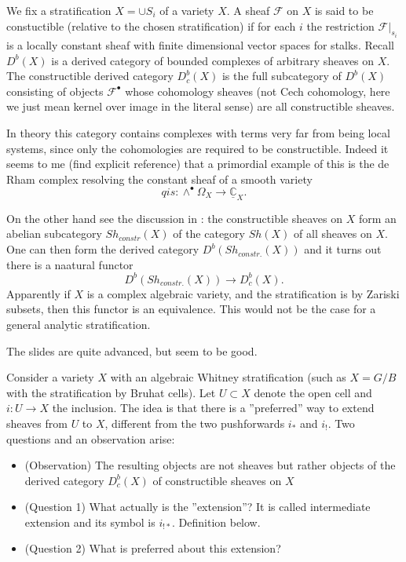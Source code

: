 \documentclass[12pt]{article}
\theoremstyle{plain}
\theoremstyle{definition}
\numberwithin{equation}{section}
\newcommand{\C}{\mathbb{C}}
\newcommand{\CF}{\mathcal{F}}
\begin{document}
We fix a stratification $X = \cup S_i$ of a variety $X$. A sheaf $\CF$ on $X$ is said to be constuctible (relative to the chosen stratification) if for each $i$ the restriction $\CF|_{s_i}$ is a locally constant sheaf with finite dimensional vector spaces for stalks. Recall $D^b(X)$ is a derived category of bounded complexes of arbitrary sheaves on $X$. The constructible derived category $D^b_c(X)$ is the full subcategory of $D^b(X)$ consisting of objects $\CF^\bullet$ whose cohomology sheaves (not Cech cohomology, here we just mean kernel over image in the literal sense) are all constructible sheaves.

{\color{red}In theory this category contains complexes with terms very far from being local systems, since only the cohomologies are required to be constructible. Indeed it seems to me (find explicit reference) that a primordial example of this is the de Rham complex resolving the constant sheaf of a smooth variety
\[
qis : \wedge^\bullet \Omega_X \rightarrow \underline{\C}_{X}.
\]

On the other hand see the discussion in {\cite[Section 4.1]{Dimca}}: the constructible sheaves on $X$ form an abelian subcategory $Sh_{constr}(X)$ of the category $Sh(X)$ of all sheaves on $X$. One can then form the derived category $D^b(Sh_{constr.}(X))$ and it turns out there is a naatural functor
\[
D^b(Sh_{constr.}(X)) \rightarrow D^b_c(X).
\]
Apparently {\cite[Theorem 4.1.4]{Dimca}} if $X$ is a complex algebraic variety, and the stratification is by Zariski subsets, then this functor is an equivalence. This would not be the case for a general analytic stratification.
}


The slides \cite{fratila} are quite advanced, but seem to be good.

Consider a variety $X$ with an algebraic Whitney stratification (such as $X = G/B$ with the stratification by Bruhat cells). Let $U \subset X$ denote the open cell and $i : U \rightarrow X$ the inclusion. The idea is that there is a ''preferred'' way to extend sheaves from $U$ to $X$, different from the two pushforwards $i_*$ and $i_!$. Two questions and an observation arise:
\begin{itemize}
 \item (Observation) The resulting objects are not sheaves but rather objects of the derived category $D^b_c(X)$ of constructible sheaves on $X$


\item (Question 1) What actually is the ''extension''? It is called intermediate extension and its symbol is $i_{!*}$. Definition below.

\item (Question 2) What is preferred about this extension?
\end{itemize}
\end{document}
